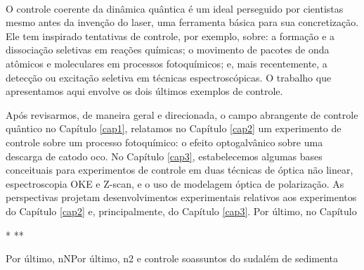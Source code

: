 \paragraph{}

O controle coerente da dinâmica quântica é um ideal perseguido por cientistas mesmo antes da invenção do laser, uma ferramenta básica para sua concretização. Ele tem inspirado tentativas de controle, por exemplo, sobre: a formação e a dissociação seletivas em reações químicas; o movimento de pacotes de onda atômicos e moleculares em processos fotoquímicos; e, mais recentemente, a detecção ou excitação seletiva em técnicas espectroscópicas. O trabalho que  apresentamos aqui envolve os dois últimos exemplos de controle.

Após revisarmos, de maneira geral e direcionada, o campo abrangente de controle quântico no Capítulo \ref{cap1}, relatamos no Capítulo \ref{cap2} um experimento de controle sobre um processo fotoquímico: o efeito optogalvânico sobre uma descarga de catodo oco. No Capítulo \ref{cap3}, estabelecemos algumas bases conceituais para experimentos de controle em duas técnicas de óptica não linear, espectroscopia OKE e Z-scan, e o uso de modelagem óptica de polarização. As perspectivas projetam desenvolvimentos experimentais relativos aos experimentos do Capítulo \ref{cap2} e, principalmente, do Capítulo \ref{cap3}. Por último, no Capítulo 








*
**



Por último, nNPor último, n2 e controle soassuntos do sudalém de  sedimenta
